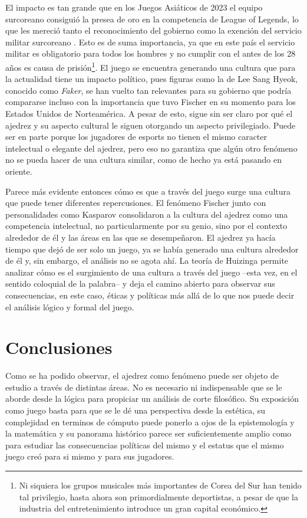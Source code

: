 \documentclass[twoside,openright,12pt,a4paper,spanish]{book}
\begin{document}
El impacto es tan grande que en los Juegos Asiáticos de 2023 el equipo surcoreano consiguió la presea de oro en la competencia de League of Legends, lo que les mereció tanto el reconocimiento del gobierno como la exención del servicio militar surcoreano \cite{juegosasiaticos}. Esto es de suma importancia, ya que en este país el servicio militar es obligatorio para todos los hombres y no cumplir con el antes de los 28 años es causa de prisión\footnote{Ni siquiera los grupos musicales más importantes de Corea del Sur han tenido tal privilegio, hasta ahora son primordialmente deportistas, a pesar de que la industria del entretenimiento introduce un gran capital económico.}. El juego se encuentra generando una cultura que para la actualidad tiene un impacto político, pues figuras como la de Lee Sang Hyeok, conocido como \emph{Faker}, se han vuelto tan relevantes para su gobierno que podría compararse incluso con la importancia que tuvo Fischer en su momento para los Estados Unidos de Norteamérica. A pesar de esto, sigue sin ser claro por qué el ajedrez y su aspecto cultural le siguen otorgando un aspecto privilegiado. Puede ser en parte porque los jugadores de esports no tienen el mismo caracter intelectual o elegante del ajedrez, pero eso no garantiza que algún otro fenómeno no se pueda hacer de una cultura similar, como de hecho ya está pasando en oriente.

Parece m\'as evidente entonces c\'omo es que a trav\'es del juego surge una cultura que puede tener diferentes repercusiones. El fen\'omeno Fischer junto con personalidades como Kasparov consolidaron a la cultura del ajedrez como una competencia intelectual, no particularmente por su genio, sino por el contexto alrededor de \'el y las áreas en las que se desempeñaron. El ajedrez ya hac\'ia tiempo que dej\'o de ser solo un juego, ya se hab\'ia generado una cultura alrededor de \'el y, sin embargo, el an\'alisis no se agota ah\'i. La teor\'ia de Huizinga permite analizar c\'omo es el surgimiento de una cultura a trav\'es del juego --esta vez, en el sentido coloquial de la palabra-- y deja el camino abierto para observar sus consecuencias, en este caso, \'eticas y pol\'iticas m\'as all\'a de lo que nos puede decir el an\'alisis l\'ogico y formal del juego.

\section{Conclusiones}

Como se ha podido observar, el ajedrez como fenómeno puede ser objeto de estudio a trav\'es de distintas \'areas. No es necesario ni indispensable que se le aborde desde la l\'ogica para propiciar un an\'alisis de corte filos\'ofico. Su exposici\'on como juego basta para que se le dé una perspectiva desde la est\'etica, su complejidad en terminos de c\'omputo puede ponerlo a ojos de la epistemolog\'ia y la matem\'atica y su panorama hist\'orico parece ser suficientemente amplio como para estudiar las consecuencias pol\'iticas del mismo y el estatus que el mismo juego cre\'o para si mismo y para sus jugadores.
\end{document}

